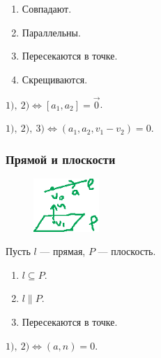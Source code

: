 \begin{enumerate}[nosep]
    \item \label{lec26:l3} Совпадают.
    \item \label{lec26:l4} Параллельны.
    \item \label{lec26:l5} Пересекаются в точке.
    \item Скрещиваются.
\end{enumerate}

\medskip
$\hyperref[lec26:l3]{1)}, \ \hyperref[lec26:l4]{2)} \iff [a_1, a_2] = \overrightarrow{0}$.

$\hyperref[lec26:l3]{1)}, \ \hyperref[lec26:l4]{2)}, \ \hyperref[lec26:l5]{3)} \iff (a_1, a_2, v_1 - v_2) = 0$.


\subsubsection{Прямой и плоскости}

\begin{figure}
    \vspace{-20pt}
    \includegraphics[height=2cm]{img/lecture26_drawing_6}
    \vspace{-110pt}
\end{figure}

Пусть $l$ --- прямая, $P$ --- плоскость.

\begin{enumerate}[nosep]
    \item \label{lec26:l6} $l \subseteq P$.
    \item \label{lec26:l7} $l \parallel P$.
    \item Пересекаются в точке.
\end{enumerate}

\medskip
$\hyperref[lec26:l6]{1)}, \ \hyperref[lec26:l7]{2)} \iff (a, n) = 0$.
